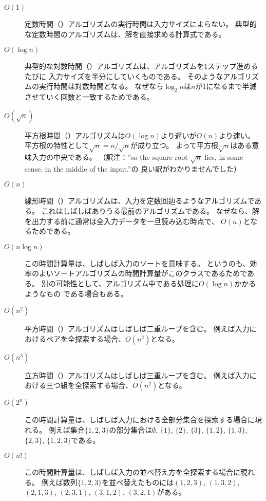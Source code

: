 \begin{description}
\item[$O(1)$]
定数時間（）アルゴリズムの実行時間は入力サイズによらない。
典型的な定数時間のアルゴリズムは、解を直接求める計算式である。

\item[$O(\log n)$]
典型的な対数時間（）アルゴリズムは、アルゴリズムを1ステップ進めるたびに
入力サイズを半分にしていくものである。
そのようなアルゴリズムの実行時間は対数時間となる。
なぜなら$\log_2 n$は$n$が1になるまで半減させていく回数と一致するためである。

\item[$O(\sqrt n)$]

平方根時間（）アルゴリズムは$O(\log n)$より遅いが$O(n)$より速い。
平方根の特性として$\sqrt n = n/\sqrt n$が成り立つ。
よって平方根$\sqrt n$はある意味入力の中央である。
（訳注：''so the square root $\sqrt n$ lies,
in some sense, in the middle of the input.''の
良い訳がわかりませんでした）

\item[$O(n)$]

線形時間（）アルゴリズムは、入力を定数回辿るようなアルゴリズムである。
これはしばしばありうる最前のアルゴリズムである。
なぜなら、解を出力する前に通常は全入力データを一旦読み込む時点で、
$O(n)$となるためである。

\item[$O(n \log n)$]
この時間計算量は、しばしば入力のソートを意味する。
というのも、効率のよいソートアルゴリズムの時間計算量がこのクラスであるためである。
別の可能性として、アルゴリズム中である処理に$O(\log n)$かかるようなもの
である場合もある。

\item[$O(n^2)$]
平方時間（）アルゴリズムはしばしば二重ループを含む。
例えば入力におけるペアを全探索する場合、$O(n^2)$となる。

\item[$O(n^3)$]
立方時間（）アルゴリズムはしばしば三重ループを含む。
例えば入力における三つ組を全探索する場合、$O(n^2)$となる。

\item[$O(2^n)$]
この時間計算量は、しばしば入力における全部分集合を探索する場合に現れる。
例えば集合$\{1,2,3\}$の部分集合は$\emptyset$, $\{1\}$, $\{2\}$, $\{3\}$, $\{1,2\}$,
$\{1,3\}$, $\{2,3\}$, $\{1,2,3\}$である。

\item[$O(n!)$]
この時間計算量は、しばしば入力の並べ替え方を全探索する場合に現れる。
例えば数列$\{1,2,3\}$を並べ替えたものには$(1,2,3)$, $(1,3,2)$, $(2,1,3)$, $(2,3,1)$,
$(3,1,2)$, $(3,2,1)$がある。
\end{description}


